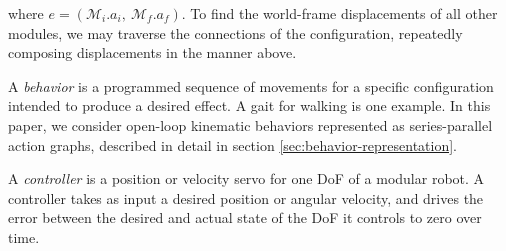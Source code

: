 \documentclass[graybox]{svmult}
\begin{document}
\begin{definition}[Configuration]
where \(e=(\mathcal{M}_i.a_i,~\mathcal{M}_f.a_f)\). To find the world-frame displacements
of all other modules, we may traverse the connections of the configuration,  repeatedly
composing displacements in the manner above. 
\end{definition}



\begin{definition}[Behavior]\label{def:behavior}
A \textit{behavior} is a programmed sequence of movements for a specific configuration
intended to produce a desired effect.  A gait for walking is one example.  In
this paper, we consider open-loop kinematic behaviors represented as
series-parallel action graphs, described in detail in section
\ref{sec:behavior-representation}.
\end{definition}
\begin{definition}[Controller]
A \textit{controller} is a position or velocity servo for one DoF of a modular
robot.  A controller takes as input a desired position or angular velocity, and
drives the error between the desired and actual state of the DoF it controls to
zero over time.
\end{definition}
\end{document}
